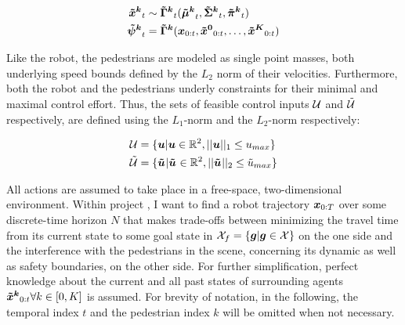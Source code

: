 \begin{align}
\xped[k]_t &\sim \distmodel[k]_t(\muped[k]_t, \sigmaped[k]_t, \piped[k]_t) \\
\dist[k]_t &= \distmodel[k] (\x_{0:t}, \xped[0]_{0:t}, \hdots, \xped[K]_{0:t})
\end{align}

Like the robot, the pedestrians are modeled as single point masses, both underlying speed bounds defined by the $L_2$ norm of their velocities. Furthermore, both the robot and the pedestrians underly constraints for their minimal and maximal control effort. Thus, the sets of feasible control inputs $
\mathcal{U}$ and $\mathcal{\tilde{U}}$ respectively, are defined using the $L_1$-norm and the $L_2$-norm respectively:

\begin{align}
\uset &= \{\u | \u \in \mathbb{R}^2, ||\u||_1 \leq u_{max}\} \\
\upedset &= \{\uped[] | \uped[] \in \mathbb{R}^2, ||\uped[]||_2 \leq \tilde{u}_{max}\} 
\label{eq:controls_bounds}
\end{align}
 
All actions are assumed to take place in a free-space, two-dimensional environment. 
\newline
Within project \project, I want to find a robot trajectory $\boldsymbol{x}_{0:T}$ over some discrete-time horizon $N$ that makes trade-offs between minimizing the travel time from its current state to some goal state in $\mathcal{X}_f = \{\boldsymbol{g} | \boldsymbol{g} \in \mathcal{X} \}$ on the one side and the interference with the pedestrians in the scene, concerning its dynamic as well as safety boundaries, on the other side. For further simplification, perfect knowledge about the current and all past states of surrounding agents $\xped[k]_{0:t} \forall k \in [0, K]$ is assumed.
\newline\newline
For brevity of notation, in the following, the temporal index $t$ and the pedestrian index $k$ will be omitted when not necessary.

